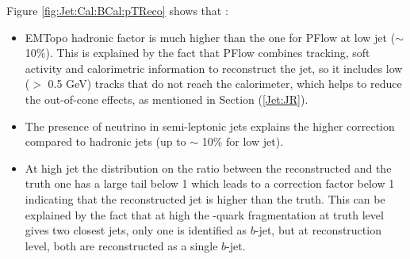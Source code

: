 Figure \ref{fig:Jet:Cal:BCal:pTReco} shows that :
\begin{itemize}
    \item EMTopo hadronic factor is much higher than the one for PFlow at low jet \pT ($\sim$ 10\%). This is explained by the fact that PFlow combines tracking, soft activity and calorimetric information to reconstruct the jet, so it includes low \pT (\pT $>$ 0.5 GeV) tracks that do not reach the calorimeter, which helps to reduce the out-of-cone effects, as mentioned in Section (\ref{Jet:JR}). 
    \item The presence of neutrino in semi-leptonic jets explains the higher correction compared to hadronic jets (up to $\sim$ 10\% for low \pT jet).
    \item At high jet \pT the distribution on the ratio between the reconstructed \pT and the truth one has a large tail below 1 which leads to a correction factor below 1 indicating that the reconstructed jet \pT is higher than the truth. This can be explained by the fact that at high \pT the \bq-quark fragmentation at truth level gives two closest jets, only one is identified as $b$-jet, but at reconstruction level, both are reconstructed as a single $b$-jet.
\end{itemize}

